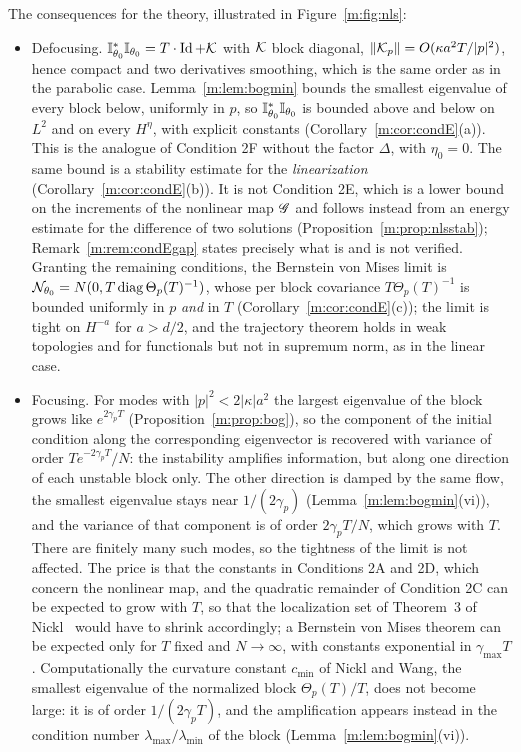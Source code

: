 The consequences for the theory, illustrated in Figure~\ref{m:fig:nls}:
\begin{itemize}[nosep]
\item Defocusing. $\mathbb{I}^*_{\theta_0}\mathbb{I}_{\theta_0}=T\cdot\operatorname{Id}+\mathcal{K}$ with $\mathcal{K}$ block diagonal, $\left\|\mathcal{K}_p\right\|=O(\kappa a^2T/|p|^2)$, hence compact and two derivatives smoothing, which is the same order as in the parabolic case. Lemma~\ref{m:lem:bogmin} bounds the smallest eigenvalue of every block below, uniformly in $p$, so $\mathbb{I}^*_{\theta_0}\mathbb{I}_{\theta_0}$ is bounded above and below on $L^2$ and on every $H^\eta$, with explicit constants (Corollary~\ref{m:cor:condE}(a)). This is the analogue of Condition 2F without the factor $\Delta$, with $\eta_0=0$. The same bound is a stability estimate for the \emph{linearization} (Corollary~\ref{m:cor:condE}(b)). It is not Condition 2E, which is a lower bound on the increments of the nonlinear map $\mathscr{G}$ and follows instead from an energy estimate for the difference of two solutions (Proposition~\ref{m:prop:nlsstab}); Remark~\ref{m:rem:condEgap} states precisely what is and is not verified. Granting the remaining conditions, the Bernstein von Mises limit is $\mathcal{N}_{\theta_0}=N(0,T\operatorname{diag}\Theta_p(T)^{-1})$, whose per block covariance $T\Theta_p(T)^{-1}$ is bounded uniformly in $p$ \emph{and} in $T$ (Corollary~\ref{m:cor:condE}(c)); the limit is tight on $H^{-a}$ for $a>d/2$, and the trajectory theorem holds in weak topologies and for functionals but not in supremum norm, as in the linear case.
\item Focusing. For modes with $|p|^2<2|\kappa|a^2$ the largest eigenvalue of the block grows like $e^{2\gamma_pT}$ (Proposition~\ref{m:prop:bog}), so the component of the initial condition along the corresponding eigenvector is recovered with variance of order $Te^{-2\gamma_pT}/N$: the instability amplifies information, but along one direction of each unstable block only. The other direction is damped by the same flow, the smallest eigenvalue stays near $1/(2\gamma_p)$ (Lemma~\ref{m:lem:bogmin}(vi)), and the variance of that component is of order $2\gamma_pT/N$, which grows with $T$. There are finitely many such modes, so the tightness of the limit is not affected. The price is that the constants in Conditions 2A and 2D, which concern the nonlinear map, and the quadratic remainder of Condition 2C can be expected to grow with $T$, so that the localization set of Theorem~3 of Nickl~\cite{nicklbvm2024} would have to shrink accordingly; a Bernstein von Mises theorem can be expected only for $T$ fixed and $N\to\infty$, with constants exponential in $\gamma_{\max}T$. Computationally the curvature constant $c_{\min}$ of Nickl and Wang, the smallest eigenvalue of the normalized block $\Theta_p(T)/T$, does not become large: it is of order $1/(2\gamma_pT)$, and the amplification appears instead in the condition number $\lambda_{\max}/\lambda_{\min}$ of the block (Lemma~\ref{m:lem:bogmin}(vi)).

\end{itemize}
